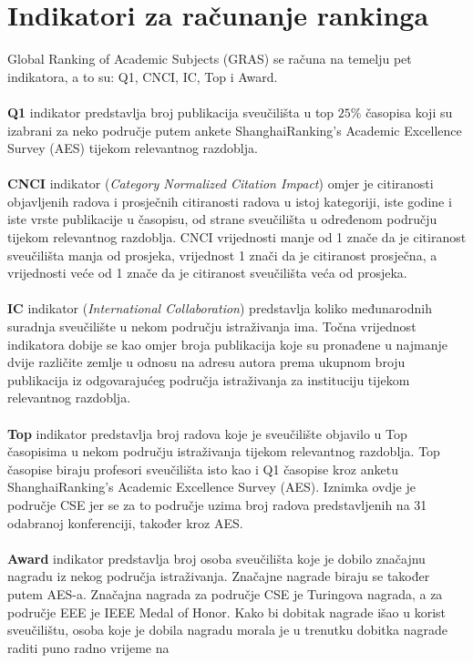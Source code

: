 \documentclass[times, utf8, zavrsni]{fer}
\begin{document}
\section{Indikatori za računanje rankinga}
Global Ranking of Academic Subjects (GRAS) se računa na temelju pet indikatora, a to su: Q1, CNCI, IC, Top i Award.
\\ \\\textbf{Q1} indikator predstavlja broj publikacija sveučilišta u top $25\%$ časopisa koji su izabrani za neko područje putem ankete ShanghaiRanking’s Academic Excellence Survey
(AES) tijekom relevantnog razdoblja.   
\\ \\\textbf{CNCI} indikator (\emph{Category Normalized Citation Impact}) omjer je citiranosti objavljenih radova i prosječnih citiranosti 
radova u istoj kategoriji, iste godine i iste vrste publikacije u časopisu, od strane sveučilišta u određenom području tijekom relevantnog razdoblja.
CNCI vrijednosti manje od 1 znače da je citiranost sveučilišta manja od prosjeka, vrijednost 1 znači da je citiranost prosječna, a vrijednosti veće od
1 znače da je citiranost sveučilišta veća od prosjeka.
\\ \\\textbf{IC} indikator (\emph{International Collaboration}) predstavlja koliko međunarodnih suradnja sveučilište u nekom području istraživanja ima.
Točna vrijednost indikatora dobije se kao omjer broja publikacija koje su pronađene u najmanje dvije različite zemlje 
u odnosu na adresu autora prema ukupnom broju publikacija iz odgovarajućeg područja istraživanja za instituciju tijekom relevantnog razdoblja.
\\ \\\textbf{Top} indikator predstavlja broj radova koje je sveučilište 
objavilo u Top časopisima u nekom području istraživanja tijekom relevantnog razdoblja.
Top časopise biraju profesori sveučilišta isto kao i Q1 časopise kroz anketu ShanghaiRanking’s Academic Excellence Survey (AES). 
Iznimka ovdje je područje CSE jer se za to područje uzima broj radova predstavljenih na 31 odabranoj konferenciji, 
također kroz AES.
\\ \\\textbf{Award} indikator predstavlja broj osoba sveučilišta koje je dobilo značajnu nagradu iz nekog područja istraživanja. Značajne nagrade 
biraju se također putem AES-a. Značajna nagrada za područje CSE je Turingova 
nagrada, a za područje EEE je IEEE Medal of Honor.
Kako bi dobitak nagrade išao u korist sveučilištu, osoba koje je dobila nagradu morala je u trenutku dobitka nagrade raditi puno radno vrijeme na 
\end{document}
